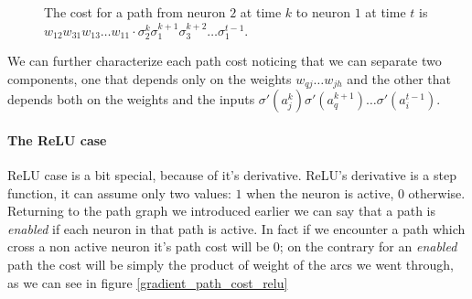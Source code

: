 \begin{figure}
\caption{The cost for a path from neuron $2$ at time $k$ to neuron $1$ at time $t$ is $w_{12}w_{31}w_{13}\hdots w_{11}\cdot \sigma_2^k \sigma_1^{k+1}\sigma_3^{k+2} \hdots \sigma_1^{t-1}$. }
\label{gradient_path_cost}
\end{figure}


We can further characterize each path cost noticing that we can separate two components, one that depends only on the weights $w_{qj} \hdots w_{jh}$ and the other that depends both on the weights and the inputs
$\sigma'(a_j^k)\sigma'(a_q^{k+1}) \hdots \sigma'(a_i^{t-1})$.


\paragraph{The ReLU case}
ReLU case is a bit special, because of it's derivative.
ReLU's derivative is a step function, it can assume only two values: $1$ when the neuron is active, $0$ otherwise.
Returning to the path graph we introduced earlier we can say that a path is \textit{enabled} if each neuron in that path is active. In fact if we
encounter a path which cross a non active neuron it's path cost will be 0; on the contrary for an \textit{enabled} path the cost will be simply the product
of weight of the arcs we went through, as we can see in figure \ref{gradient_path_cost_relu}


